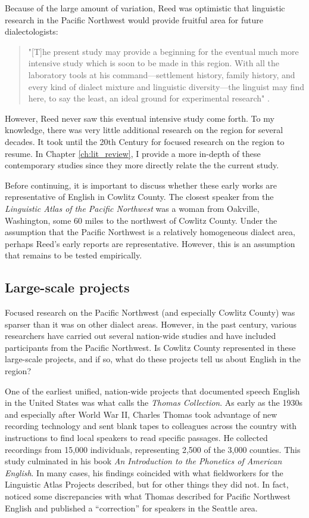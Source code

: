 Because of the large amount of variation, Reed was optimistic that linguistic research in the Pacific Northwest would provide fruitful area for future dialectologists:
\begin{quote}
    "[T]he present study may provide a beginning for the eventual much more intensive study which is soon to be made in this region. With all the laboratory tools at his command---settlement history, family history, and every kind of dialect mixture and linguistic diversity---the linguist may find here, to say the least, an ideal ground for experimental research" \citeyearpar[Reed][189]{reed_1952}.
\end{quote}
However, Reed never saw this eventual intensive study come forth. To my knowledge, there was very little additional research on the region for several decades. It took until the 20th Century for focused research on the region to resume. In Chapter \ref{ch:lit_review}, I provide a more in-depth of these contemporary studies since they more directly relate the the current study.

Before continuing, it is important to discuss whether these early works are representative of English in Cowlitz County. The closest speaker from the \textit{Linguistic Atlas of the Pacific Northwest} was a woman from Oakville, Washington, some 60 miles to the northwest of Cowlitz County. Under the assumption that the Pacific Northwest is a relatively homogeneous dialect area, perhaps Reed's early reports are representative. However, this is an assumption that remains to be tested empirically.

\subsection{Large-scale projects}

Focused research on the Pacific Northwest (and especially Cowlitz County) was sparser than it was on other dialect areas. However, in the past century, various researchers have carried out several nation-wide studies and have included participants from the Pacific Northwest. Is Cowlitz County represented in these large-scale projects, and if so, what do these projects tell us about English in the region?

One of the earliest unified, nation-wide projects that documented speech English in the United States was what \citet[216--217]{allen_1977} calls the \textit{Thomas Collection}. As early as the 1930s and especially after World War II, Charles Thomas took advantage of new recording technology and sent blank tapes to colleagues across the country with instructions to find local speakers to read specific passages. He collected recordings from 15,000 individuals, representing 2,500 of the 3,000 counties. This study culminated in his \citeyear{thomas_1958} book \textit{An Introduction to the Phonetics of American English}. In many cases, his findings coincided with what fieldworkers for the Linguistic Atlas Projects described, but for other things they did not. In fact, \citet{foster_hoffman_1966} noticed some discrepancies with what Thomas described for Pacific Northwest English and published a ``correction'' for speakers in the Seattle area.

